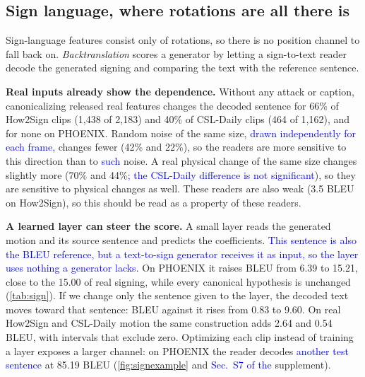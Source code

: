 \documentclass[10pt,twocolumn,letterpaper]{article}
\newcommand{\new}[1]{\textcolor{blue}{#1}}%
\begin{document}
\subsection{Sign language, where rotations are all there is}

Sign-language features consist only of rotations, so there is no position channel to fall back on. \emph{Backtranslation} scores a generator by letting a sign-to-text reader decode the generated signing and comparing the text with the reference sentence.

\textbf{Real inputs already show the dependence.} Without any attack or caption, canonicalizing released real features changes the decoded sentence for 66\% of How2Sign clips (1,438 of 2,183) and 40\% of CSL-Daily clips (464 of 1,162), and for none on PHOENIX. Random noise of the same size\new{, drawn independently for each frame,} changes fewer (42\% and 22\%), so the readers are more sensitive to this direction than to \new{such} noise. A real physical change of the same size changes slightly more (70\% and 44\%\new{; the CSL-Daily difference is not significant}), so they are sensitive to physical changes as well. These readers are also weak (3.5 BLEU on How2Sign), so this should be read as a property of these readers.

\textbf{A learned layer can steer the score.} A small layer reads the generated motion and its source sentence and predicts the coefficients. \new{This sentence is also the BLEU reference, but a text-to-sign generator receives it as input, so the layer uses nothing a generator lacks.} On PHOENIX it raises BLEU from 6.39 to 15.21, close to the 15.00 of real signing, while every canonical hypothesis is unchanged (\cref{tab:sign}). If we change only the sentence given to the layer, the decoded text moves toward that sentence: BLEU against it rises from 0.83 to 9.60. On real How2Sign and CSL-Daily motion the same construction adds 2.64 and 0.54 BLEU, with intervals that exclude zero. Optimizing each clip instead of training a layer exposes a larger channel: on PHOENIX the reader decodes \new{another test sentence} at 85.19 BLEU (\cref{fig:signexample} and \new{Sec.~S7 of the} supplement).
\end{document}
